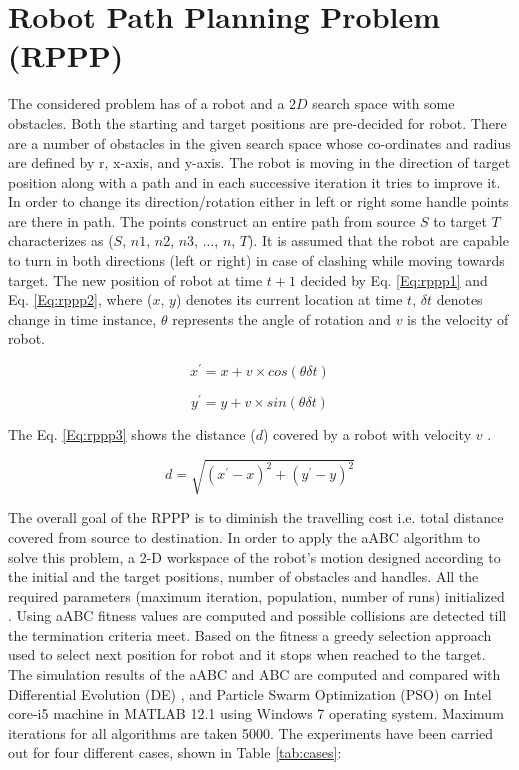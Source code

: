 \documentclass{svproc}
\begin{document}
\section{Robot Path Planning Problem (RPPP)}\label{sec:rppp}
The considered problem has of a robot and a $2D$ search space with some obstacles. Both the starting and target positions are pre-decided for robot. There are a number of obstacles in the given search space whose co-ordinates and radius are defined by r, x-axis, and y-axis. The robot is moving in the direction of target position along with a path and in each successive iteration it tries to improve it. In order to change its direction/rotation either in left or right some handle points are there in path. The points construct an entire path from source $S$ to target $T$ characterizes as ($S$, $n1$, $n2$, $n3$, ..., $n$, $T$). It is assumed that the robot are capable to turn in both directions (left or right) in case of clashing while moving towards target. The new position of robot at time $t+1$ decided by Eq. \ref{Eq:rppp1} and Eq. \ref{Eq:rppp2}, where ($x$, $y$) denotes its current location at time $t$, $\delta t$  denotes change in time instance, $\theta$ represents the angle of rotation and $v$ is the velocity of robot.

\begin{equation}\label{Eq:rppp1}
x^{'}=x+v \times cos(\theta \delta t)
\end{equation}

\begin{equation}\label{Eq:rppp2}
y^{'}=y+v \times sin(\theta \delta t)
\end{equation}


The Eq. \ref{Eq:rppp3} shows the distance ($d$) covered by a robot with velocity $v$ .

\begin{equation}\label{Eq:rppp3}
d=\sqrt{(x^{'}-x)^2+(y^{'}-y)^2}
\end{equation}

The overall goal of the RPPP is to diminish the travelling cost i.e. total distance covered from source to destination. In order to apply the aABC algorithm to solve this problem, a 2-D workspace of the robot's motion designed according to the initial and the target positions, number of obstacles and handles. All the required parameters (maximum iteration, population, number of runs) initialized \cite{sharma2019black}. Using aABC fitness values are computed and possible collisions are detected till the termination criteria meet. Based on the fitness a greedy selection approach used to select next position for robot and it stops when reached to the target. The simulation results of the aABC \cite{kumar2019arrhenius} and ABC \cite{karaboga2005idea} are computed and compared with  Differential Evolution (DE) \cite{storn1997differential}, and Particle Swarm Optimization (PSO) \cite{kennedy1995j} on Intel core-i5 machine in MATLAB 12.1 using Windows 7 operating system. Maximum iterations for all algorithms are taken 5000. The experiments have been carried out for four different cases, shown in Table \ref{tab:cases}:
\end{document}
